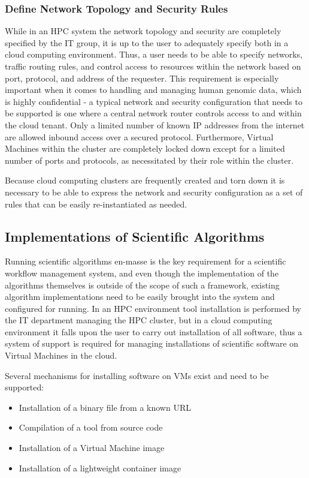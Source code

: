 \subsubsection{Define Network Topology and Security Rules}
While in an HPC system the network topology and security are completely specified by the IT group, it is up to the user to adequately specify both in a cloud computing environment. Thus, a user needs to be able to specify networks, traffic routing rules, and control access to resources within the network based on port, protocol, and address of the requester. This requirement is especially important when it comes to handling and managing human genomic data, which is highly confidential - a typical network and security configuration that needs to be supported is one where a central network router controls access to and within the cloud tenant. Only a limited number of known IP addresses from the internet are allowed inbound access over a secured protocol. Furthermore, Virtual Machines within the cluster are completely locked down except for a limited number of ports and protocols, as necessitated by their role within the cluster.

Because cloud computing clusters are frequently created and torn down it is necessary to be able to express the network and security configuration as a set of rules that can be easily re-instantiated as needed.

\subsection {Implementations of Scientific Algorithms} \label{sec:algorithm_implementation}
Running scientific algorithms en-masse is the key requirement for a scientific workflow management system, and even though the implementation of the algorithms themselves is outside of the scope of such a framework, existing algorithm implementations need to be easily brought into the system and configured for running.  In an HPC environment tool installation is performed by the IT department managing the HPC cluster, but in a cloud computing environment it falls upon the user to carry out installation of all software, thus a system of support is required for managing installations of scientific software on Virtual Machines in the cloud.

Several mechanisms for installing software on VMs exist and need to be supported:
\begin{itemize}
\item Installation of a binary file from a known URL
\item Compilation of a tool from source code
\item Installation of a Virtual Machine image
\item Installation of a lightweight container image
\end{itemize}


